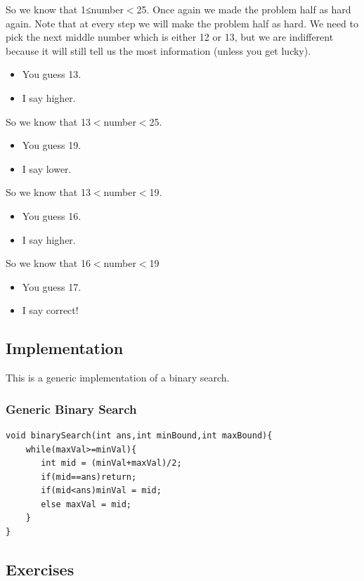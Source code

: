 \documentclass[11pt,oneside]{book}
\begin{document}
So we know that 1≤number$<$25. Once again we made the problem half as hard again. Note that at every step we will make the problem half as hard. We need to pick the next middle number which is either 12 or 13, but we are indifferent because it will still tell us the most information (unless you get lucky).

\begin{itemize}
\item You guess 13.
\item I say higher.
\end{itemize}

So we know that 13$<$number$<$25.

\begin{itemize}
\item You guess 19.
\item I say lower.
\end{itemize}

So we know that 13$<$number$<$19.

\begin{itemize}
\item You guess 16.
\item I say higher.
\end{itemize}

So we know that 16$<$number$<$19

\begin{itemize}
\item You guess 17.
\item I say correct!
\end{itemize}

\subsection{Implementation}

This is a generic implementation of a binary search.

\subsubsection{Generic Binary Search}

\begin{lstlisting}
void binarySearch(int ans,int minBound,int maxBound){
    while(maxVal>=minVal){
       int mid = (minVal+maxVal)/2;
       if(mid==ans)return;
       if(mid<ans)minVal = mid;
       else maxVal = mid;
    }
}
\end{lstlisting}

\subsection{Exercises}
\end{document}
